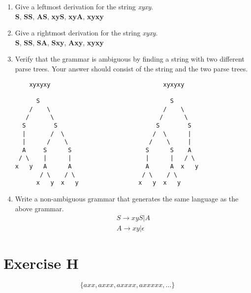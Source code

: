 \documentclass{article}
\begin{document}
\begin{enumerate}
    \item Give a leftmost derivation for the string \emph{xyxy}. \\
        \vspace{1mm}
         \textbf{S},
         \textbf{SS},
         \textbf{AS},
         \textbf{xyS},
         \textbf{xyA},
         \textbf{xyxy}
    \item Give a rightmost derivation for the string \emph{xyxy}. \\
        \vspace{1mm}
         \textbf{S},
         \textbf{SS},
         \textbf{SA},
         \textbf{Sxy},
         \textbf{Axy},
         \textbf{xyxy}
    \item Verify that the grammar is ambiguous by finding a string with two different parse trees. Your answer should consist of the string and the two parse trees.

\begin{verbatim}
    xyxyxy                                xyxyxy

      S                                     S
    /    \                                /    \
   /      \                              /      \
  S        S                            S        S
  |       /  \                         /  \      |
  |      /    \                       /    \     |
  A     S      S                     S      S    A
 / \    |      |                     |      |   / \
x   y   A      A                     A      A  x   y
       / \    / \                   / \    / \
      x   y  x   y                 x   y  x   y
\end{verbatim}

    \item Write a non-ambiguous grammar that generates the same language as the above grammar.
\begin{align}
S \rightarrow xyS | A \\
A \rightarrow xy | \epsilon
\end{align}
\end{enumerate}

\section*{Exercise H}
\begin{equation}
\{axx, axxx, axxxx, axxxxx, \ldots \}
\end{equation}
\end{document}
